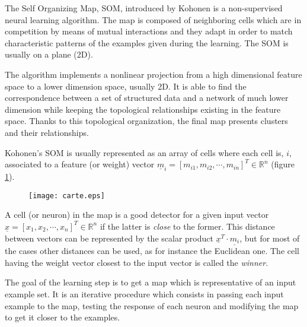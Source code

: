 The Self Organizing Map, SOM, introduced by Kohonen is a
non-supervised neural
learning algorithm. The map is composed of neighboring cells which are
in competition by means of mutual interactions and they adapt in order
to match characteristic patterns of the examples given during the
learning. The SOM is usually on a plane (2D).

The algorithm implements a nonlinear projection from a high
dimensional feature space to a lower dimension space, usually 2D. It
is able to find the correspondence between a set of structured data
and a network of much lower dimension while keeping the topological
relationships existing in the feature space. Thanks to this
topological organization, the final map presents clusters and their
relationships. 

Kohonen's SOM is usually represented as an array of cells where each
cell is, $i$, associated to a feature (or weight) vector  $\underline m_i = \left[m_{i1},m_{i2},\cdots,m_{in}\right]^T\in
\mathbb{R}^n$ (figure \ref{carte}).\\
\begin{figure}
\center
\texttt{[image: carte.eps]}
\label{carte}
\end{figure}

A cell (or neuron) in the map is a good detector for a given input
vector $\underline x = \left[x_{1},x_{2},\cdots,x_{n}\right]^T\in
\mathbb{R}^n$ if the latter is {\em close} to the former. This
distance between vectors can be represented by the scalar product 
$\underline{x}^T\cdot\underline{m_i}$, but for most of the cases other
distances can be used, as for instance the Euclidean one. The cell
having the weight vector closest to the input vector is called the
{\em winner}.

The goal of the learning step is to get a map which is representative
of an input example set. It is an iterative procedure which consists
in passing each input example to the map, testing the response of each
neuron and modifying the map to get it closer to the examples.

